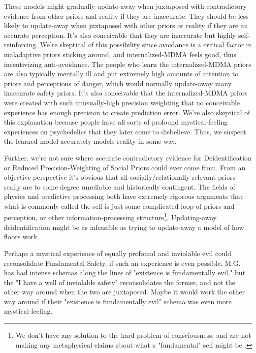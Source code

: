 \documentclass[12pt,letterpaper]{book}
\begin{document}
These models might gradually update-away when juxtaposed with contradictory evidence from other priors and reality if they are inaccurate. They should be less likely to update-away when juxtaposed with other priors or reality if they are an accurate perception. It's also conceivable that they are inaccurate but highly self-reinforcing. We're skeptical of this possibility since avoidance is a critical factor in maladaptive priors sticking around, and internalized-MDMA feels good, thus incentivizing anti-avoidance. The people who learn the internalized-MDMA priors are also typically mentally ill and put extremely high amounts of attention to priors and perceptions of danger, which would normally update-away many inaccurate safety priors. It's also conceivable that the internalized-MDMA priors were created with such unusually-high precision weighting that no conceivable experience has enough precision to create prediction error. We're also skeptical of this explanation because people have all sorts of profound mystical-feeling experiences on psychedelics that they later come to disbelieve. Thus, we suspect the learned model accurately models reality in some way.

Further, we're not sure where accurate contradictory evidence for Deidentification or Reduced Precision-Weighting of Social Priors could ever come from. From an objective perspective it's obvious that all socially/relationally-relevant priors really are to some degree unreliable and historically contingent. The fields of physics and predictive processing both have extremely rigorous arguments that what is commonly called the self is just some complicated loop of priors and perception, or other information-processing structure\footnote{We don't have any solution to the hard problem of consciousness, and are not making any metaphysical claims about what a "fundamental" self might be \cite{hardProblem}.}. Updating-away deidentification might be as infeasible as trying to update-away a model of how floors work.

Perhaps a mystical experience of equally profound and inviolable evil could reconsolidate Fundamental Safety, if such an experience is even possible. M.G. has had intense schemas along the lines of "existence is fundamentally evil," but the "I have a well of inviolable safety" reconsolidates the former, and not the other way around when the two are juxtaposed. Maybe it would work the other way around if their "existence is fundamentally evil" schema was even more mystical-feeling.
\end{document}
